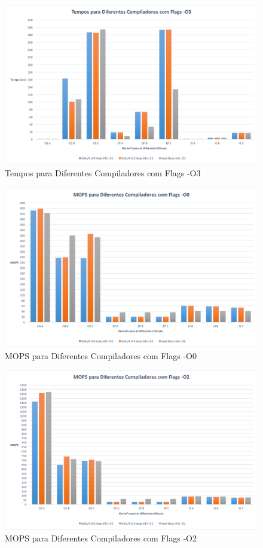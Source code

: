 \documentclass[conference,compsoc]{IEEEtran}
\begin{document}
\begin{figure}[h!]
\centering
\includegraphics[scale=0.325]{SER/tempos_dif_comp_O3_nodo_641.png}
\caption{Tempos para Diferentes Compiladores com Flags -O3}
\end{figure}

\begin{figure}[h!]
\centering
\includegraphics[scale=0.325]{SER/mops_dif_comp_O0_nodo_641.png}
\caption{MOPS para Diferentes Compiladores com Flags -O0}
\end{figure}

\begin{figure}[h!]
\centering
\includegraphics[scale=0.325]{SER/mops_dif_comp_O2_nodo_641.png}
\caption{MOPS para Diferentes Compiladores com Flags -O2}
\end{figure}
\end{document}
